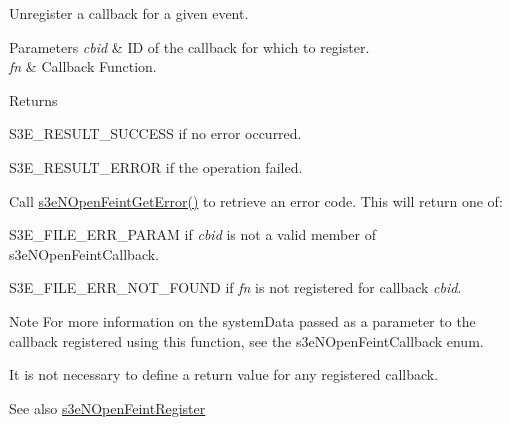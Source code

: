 \label{group___n_open_feint_api_group_ga622ceda63aaf8c2c0765ee8a086dfe60}
Unregister a callback for a given event. 
\begin{DoxyParams}{Parameters}
{\em cbid} & ID of the callback for which to register. \\
\hline
{\em fn} & Callback Function. \\
\hline
\end{DoxyParams}
\begin{DoxyReturn}{Returns}

\begin{DoxyItemize}
\item S3E\_\-RESULT\_\-SUCCESS if no error occurred.
\item S3E\_\-RESULT\_\-ERROR if the operation failed.\par
 Call \hyperlink{group___n_open_feint_api_group_ga1547aacf4dfcb626c1d5515d91916106}{s3eNOpenFeintGetError()} to retrieve an error code. This will return one of:
\begin{DoxyItemize}
\item S3E\_\-FILE\_\-ERR\_\-PARAM if {\itshape cbid\/} is not a valid member of s3eNOpenFeintCallback.
\item S3E\_\-FILE\_\-ERR\_\-NOT\_\-FOUND if {\itshape fn\/} is not registered for callback {\itshape cbid\/}. 
\end{DoxyItemize}
\end{DoxyItemize}
\end{DoxyReturn}
\begin{DoxyNote}{Note}
For more information on the systemData passed as a parameter to the callback registered using this function, see the s3eNOpenFeintCallback enum. 

It is not necessary to define a return value for any registered callback. 
\end{DoxyNote}
\begin{DoxySeeAlso}{See also}
\hyperlink{group___n_open_feint_api_group_ga15c3278f021ef1cdbc4f2b522444cc90}{s3eNOpenFeintRegister} 
\end{DoxySeeAlso}
